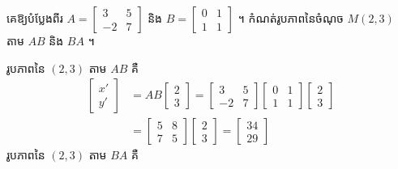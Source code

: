 \begin{example}[លំហាត់គំរូ ២]
គេឱ្យបំប្លែងពីរ $A = \begin{bmatrix} 3 & 5\\ -2 & 7 \end{bmatrix}$ និង $B = \begin{bmatrix} 0 & 1\\ 1 & 1 \end{bmatrix}$ ។ កំណត់រូបភាពនៃចំណុច $M(2, 3)$ តាម $AB$ និង $BA$ ។
\end{example}
\ans
រូបភាពនៃ $(2, 3)$ តាម $AB$ គឺ
\[
\begin{aligned}
\begin{bmatrix} x'\\ y' \end{bmatrix} &= AB\begin{bmatrix} 2\\ 3 \end{bmatrix} = \begin{bmatrix} 3 & 5\\ -2 & 7 \end{bmatrix}\begin{bmatrix} 0 & 1\\ 1 & 1 \end{bmatrix}\begin{bmatrix} 2\\ 3 \end{bmatrix}\\
&= \begin{bmatrix} 5 & 8\\ 7 & 5 \end{bmatrix}\begin{bmatrix} 2\\ 3 \end{bmatrix} = \begin{bmatrix} 34\\ 29 \end{bmatrix}
\end{aligned}
\]
រូបភាពនៃ $(2, 3)$ តាម $BA$ គឺ
